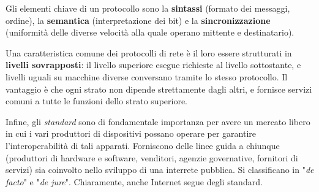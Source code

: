 \vspace{3mm}

Gli elementi chiave di un protocollo sono la \textbf{sintassi} (formato dei messaggi, ordine), la \textbf{semantica} (interpretazione dei bit) e la \textbf{sincronizzazione} (uniformità delle diverse velocità alla quale operano mittente e destinatario).

\vspace{3mm}

Una caratteristica comune dei protocolli di rete è il loro essere strutturati in \textbf{livelli sovrapposti}: il livello superiore esegue richieste al livello sottostante, e livelli uguali su macchine diverse conversano tramite lo stesso protocollo. Il vantaggio è che ogni strato non dipende strettamente dagli altri, e fornisce servizi comuni a tutte le funzioni dello strato superiore. 

\vspace{3mm}

Infine, gli \textit{standard} sono di fondamentale importanza per avere un mercato libero in cui i vari produttori di dispositivi possano operare per garantire l’interoperabilità di tali apparati. Forniscono delle linee guida a chiunque (produttori di hardware e software, venditori, agenzie governative, fornitori di servizi) sia coinvolto nello sviluppo di una interrete pubblica. Si classificano in "\textit{de facto}" e "\textit{de jure}". Chiaramente, anche Internet segue degli standard.

